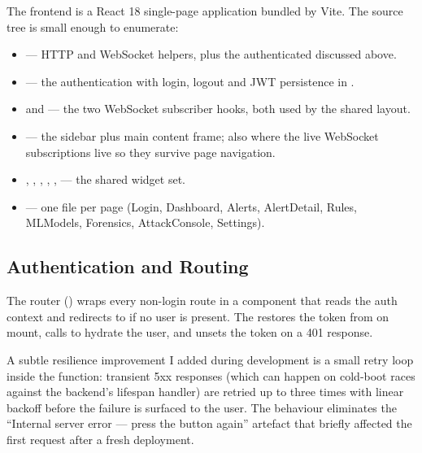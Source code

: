 The frontend is a React 18 single-page application bundled by
Vite. The source tree is small enough to enumerate:

\begin{itemize}
  \item {} --- HTTP and WebSocket helpers,
    plus the authenticated  discussed above.
  \item {} --- the authentication
     with login, logout and JWT persistence in
    .
  \item {} and
     --- the two WebSocket
    subscriber hooks, both used by the shared layout.
  \item {} --- the sidebar plus
    main content frame; also where the live WebSocket
    subscriptions live so they survive page navigation.
  \item {},
    ,
    ,
    ,
    ,
     --- the shared widget set.
  \item {} --- one file per page (Login,
    Dashboard, Alerts, AlertDetail, Rules, MLModels, Forensics,
    AttackConsole, Settings).
\end{itemize}

\subsection{Authentication and Routing}
\label{sec:design-routing}

The router () wraps every non-login route in a
 component that reads the auth context and
redirects to  if no user is present. The
 restores the token from
 on mount, calls  to
hydrate the user, and unsets the token on a 401 response.

A subtle resilience improvement I added during development is a
small retry loop inside the  function: transient
5xx responses (which can happen on cold-boot races against the
backend's lifespan handler) are retried up to three times with
linear backoff before the failure is surfaced to the user. The
behaviour eliminates the ``Internal server error --- press the
button again'' artefact that briefly affected the first request
after a fresh deployment.

